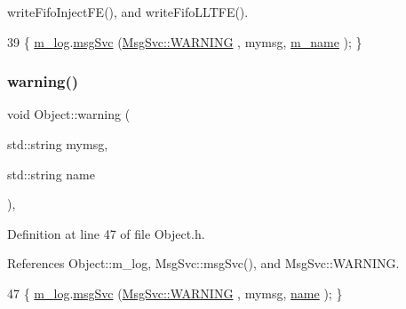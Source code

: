 write\+Fifo\+Inject\+F\+E(), and write\+Fifo\+L\+L\+T\+F\+E().


\begin{DoxyCode}
39 \{ \hyperlink{classObject_a0d269813dd7ac1f24bc143031e2963f2}{m\_log}.\hyperlink{classMsgSvc_ad25f18047920cc59a314e5098259711c}{msgSvc} (\hyperlink{classMsgSvc_ae671eb7301996cd049d2da8a65925926a7cefae88f2ba26b2b05b676a383c834b}{MsgSvc::WARNING} , mymsg, \hyperlink{classObject_a8b83c95c705d2c3ba0d081fe1710f48d}{m\_name} ); \}
\end{DoxyCode}
\mbox{\label{classObject_a11f101db4dd73d9391b0231818881d86}} 
\subsubsection{\texorpdfstring{warning()}{warning()}\hspace{0.1cm}{\footnotesize\ttfamily [2/2]}}
{\footnotesize\ttfamily void Object\+::warning (\begin{DoxyParamCaption}\item[{std\+::string}]{mymsg,  }\item[{std\+::string}]{name }\end{DoxyParamCaption})\hspace{0.3cm}{\ttfamily [inline]}, {\ttfamily [inherited]}}



Definition at line 47 of file Object.\+h.



References Object\+::m\+\_\+log, Msg\+Svc\+::msg\+Svc(), and Msg\+Svc\+::\+W\+A\+R\+N\+I\+NG.


\begin{DoxyCode}
47 \{ \hyperlink{classObject_a0d269813dd7ac1f24bc143031e2963f2}{m\_log}.\hyperlink{classMsgSvc_ad25f18047920cc59a314e5098259711c}{msgSvc} (\hyperlink{classMsgSvc_ae671eb7301996cd049d2da8a65925926a7cefae88f2ba26b2b05b676a383c834b}{MsgSvc::WARNING} , mymsg, \hyperlink{classObject_a300f4c05dd468c7bb8b3c968868443c1}{name} ); \}
\end{DoxyCode}
\mbox{\label{classFEB__v1_a0afafcfdea15d3268284203a90c67572}} 
